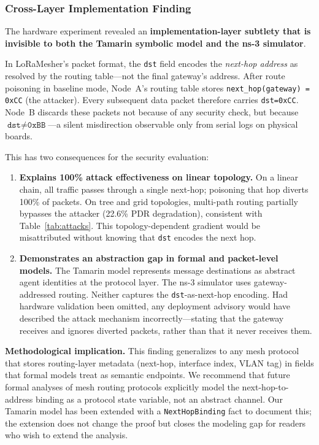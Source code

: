 \documentclass[10pt,journal,compsoc]{IEEEtran}
\begin{document}
\subsubsection{Cross-Layer Implementation Finding}
\label{sec:cross-layer-finding}

The hardware experiment revealed an \textbf{implementation-layer
subtlety that is invisible to both the Tamarin symbolic model and
the ns-3 simulator}.

In LoRaMesher's packet format, the \texttt{dst} field encodes the
\emph{next-hop address} as resolved by the routing table—not the
final gateway's address.
After route poisoning in baseline mode, Node~A's routing table
stores \texttt{next\_hop(gateway) = 0xCC} (the attacker).
Every subsequent data packet therefore carries \texttt{dst=0xCC}.
Node~B discards these packets not because of any security check,
but because $\texttt{dst} \neq \texttt{0xBB}$—a silent misdirection
observable only from serial logs on physical boards.

This has two consequences for the security evaluation:

\begin{enumerate}
  \item \textbf{Explains 100\% attack effectiveness on linear topology.}
    On a linear chain, all traffic passes through a single next-hop;
    poisoning that hop diverts 100\% of packets.
    On tree and grid topologies, multi-path routing partially bypasses
    the attacker (22.6\% PDR degradation), consistent with Table~\ref{tab:attacks}.
    This topology-dependent gradient would be misattributed without
    knowing that \texttt{dst} encodes the next hop.

  \item \textbf{Demonstrates an abstraction gap in formal and
    packet-level models.}
    The Tamarin model represents message destinations as abstract
    agent identities at the protocol layer.
    The ns-3 simulator uses gateway-addressed routing.
    Neither captures the \texttt{dst}-as-next-hop encoding.
    Had hardware validation been omitted, any deployment advisory
    would have described the attack mechanism incorrectly—stating that
    the gateway receives and ignores diverted packets, rather than that
    it never receives them.
\end{enumerate}

\textbf{Methodological implication.}
This finding generalizes to any mesh protocol that stores
routing-layer metadata (next-hop, interface index, VLAN tag) in
fields that formal models treat as semantic endpoints.
We recommend that future formal analyses of mesh routing protocols
explicitly model the next-hop-to-address binding as a protocol
state variable, not an abstract channel.
Our Tamarin model has been extended with a
\texttt{NextHopBinding} fact to document this; the extension does not
change the proof but closes the modeling gap for readers who wish
to extend the analysis.
\end{document}

